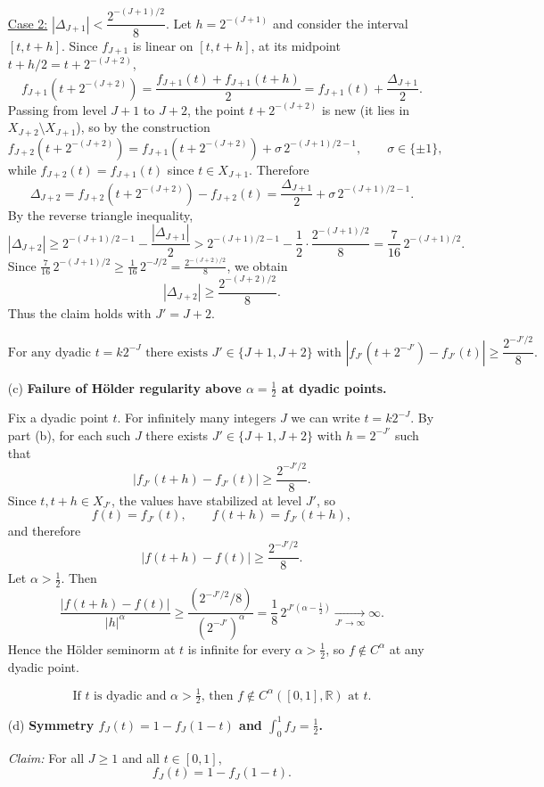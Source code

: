 \documentclass{article}
\begin{document}
\begin{enumerate}
\medskip
\noindent\underline{Case 2:} $|\Delta_{J+1}|< \dfrac{2^{-(J+1)/2}}{8}$. Let $h=2^{-(J+1)}$ and consider the interval $[t,t+h]$.
Since $f_{J+1}$ is linear on $[t,t+h]$, at its midpoint $t+h/2=t+2^{-(J+2)}$,
\[
f_{J+1}(t+2^{-(J+2)})=\frac{f_{J+1}(t)+f_{J+1}(t+h)}{2}
=f_{J+1}(t)+\frac{\Delta_{J+1}}{2}.
\]
Passing from level $J+1$ to $J+2$, the point $t+2^{-(J+2)}$ is new (it lies in $X_{J+2}\setminus X_{J+1}$),
so by the construction
\[
f_{J+2}(t+2^{-(J+2)})=f_{J+1}(t+2^{-(J+2)})+\sigma\,2^{-(J+1)/2-1},
\qquad \sigma\in\{\pm 1\},
\]
while $f_{J+2}(t)=f_{J+1}(t)$ since $t\in X_{J+1}$.
Therefore
\[
\Delta_{J+2}
=f_{J+2}(t+2^{-(J+2)})-f_{J+2}(t)
=\frac{\Delta_{J+1}}{2}+\sigma\,2^{-(J+1)/2-1}.
\]
By the reverse triangle inequality,
\[
|\Delta_{J+2}|
\ge 2^{-(J+1)/2-1}-\frac{|\Delta_{J+1}|}{2}
> 2^{-(J+1)/2-1}-\frac12\cdot\frac{2^{-(J+1)/2}}{8}
= \frac{7}{16}\,2^{-(J+1)/2}.
\]
Since $\frac{7}{16}\,2^{-(J+1)/2}\ge \frac{1}{16}\,2^{-J/2}=\frac{2^{-(J+2)/2}}{8}$, we obtain
\[
|\Delta_{J+2}|\ge \frac{2^{-(J+2)/2}}{8}.
\]
Thus the claim holds with $J'=J+2$.

\[
\boxed{\text{For any dyadic $t=k2^{-J}$ there exists $J'\in\{J+1,J+2\}$ with }
|f_{J'}(t+2^{-J'})-f_{J'}(t)|\ge \frac{2^{-J'/2}}{8}.}
\]

\item[(c)] \textbf{Failure of H\"older regularity above $\alpha=\tfrac12$ at dyadic points.}

Fix a dyadic point $t$. For infinitely many integers $J$ we can write $t=k2^{-J}$.
By part (b), for each such $J$ there exists $J'\in\{J+1,J+2\}$ with $h=2^{-J'}$ such that
\[
|f_{J'}(t+h)-f_{J'}(t)|\ge \frac{2^{-J'/2}}{8}.
\]
Since $t,t+h\in X_{J'}$, the values have stabilized at level $J'$, so
\[
f(t)=f_{J'}(t),\qquad f(t+h)=f_{J'}(t+h),
\]
and therefore
\[
|f(t+h)-f(t)|\ge \frac{2^{-J'/2}}{8}.
\]
Let $\alpha>\tfrac12$. Then
\[
\frac{|f(t+h)-f(t)|}{|h|^\alpha}
\ge \frac{(2^{-J'/2}/8)}{(2^{-J'})^\alpha}
=\frac{1}{8}\,2^{J'(\alpha-\frac12)}\xrightarrow[J'\to\infty]{}\infty.
\]
Hence the H\"older seminorm at $t$ is infinite for every $\alpha>\tfrac12$, so $f\notin C^\alpha$ at any dyadic point.

\[
\boxed{\text{If $t$ is dyadic and $\alpha>\tfrac12$, then $f\notin C^\alpha([0,1],\mathbb{R})$ at $t$.}}
\]

\item[(d)] \textbf{Symmetry $f_J(t)=1-f_J(1-t)$ and $\int_0^1 f_J=\tfrac12$.}

\medskip
\noindent\emph{Claim:} For all $J\ge 1$ and all $t\in[0,1]$,
\[
f_J(t)=1-f_J(1-t).
\tag{D1}
\]


\end{enumerate}
\end{document}
